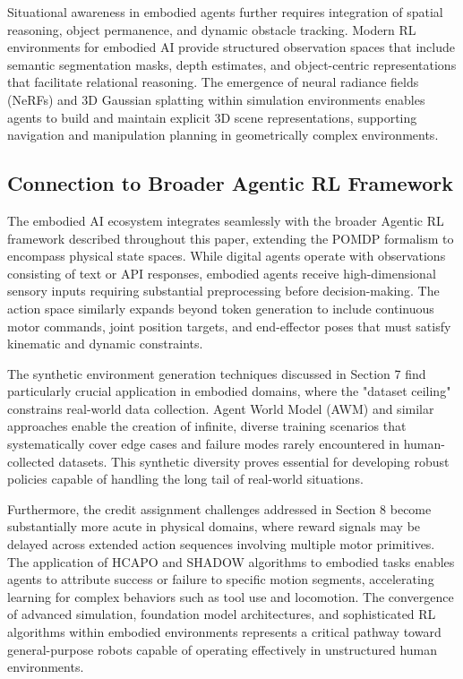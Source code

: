 Situational awareness in embodied agents further requires integration of spatial reasoning, object permanence, and dynamic obstacle tracking. Modern RL environments for embodied AI provide structured observation spaces that include semantic segmentation masks, depth estimates, and object-centric representations that facilitate relational reasoning. The emergence of neural radiance fields (NeRFs) and 3D Gaussian splatting within simulation environments enables agents to build and maintain explicit 3D scene representations, supporting navigation and manipulation planning in geometrically complex environments.

\subsection{Connection to Broader Agentic RL Framework}

The embodied AI ecosystem integrates seamlessly with the broader Agentic RL framework described throughout this paper, extending the POMDP formalism to encompass physical state spaces. While digital agents operate with observations consisting of text or API responses, embodied agents receive high-dimensional sensory inputs requiring substantial preprocessing before decision-making. The action space similarly expands beyond token generation to include continuous motor commands, joint position targets, and end-effector poses that must satisfy kinematic and dynamic constraints.

The synthetic environment generation techniques discussed in Section 7 find particularly crucial application in embodied domains, where the "dataset ceiling" constrains real-world data collection. Agent World Model (AWM) and similar approaches enable the creation of infinite, diverse training scenarios that systematically cover edge cases and failure modes rarely encountered in human-collected datasets. This synthetic diversity proves essential for developing robust policies capable of handling the long tail of real-world situations.

Furthermore, the credit assignment challenges addressed in Section 8 become substantially more acute in physical domains, where reward signals may be delayed across extended action sequences involving multiple motor primitives. The application of HCAPO and SHADOW algorithms to embodied tasks enables agents to attribute success or failure to specific motion segments, accelerating learning for complex behaviors such as tool use and locomotion. The convergence of advanced simulation, foundation model architectures, and sophisticated RL algorithms within embodied environments represents a critical pathway toward general-purpose robots capable of operating effectively in unstructured human environments.
